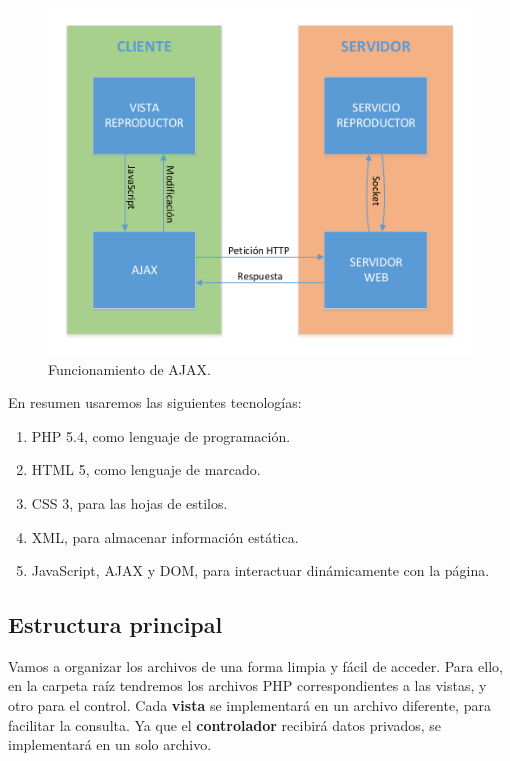 \begin{figure}[H]
	\noindent \begin{centering}
		\includegraphics[width=\linewidth/2]{capitulo5/ajax}
		\par\end{centering}
	\smallskip
	\caption{\label{fig:ajax} Funcionamiento de AJAX.}
\end{figure} 

\newpage

En resumen usaremos las siguientes tecnologías:

\begin{enumerate}
	\item \acrshort{PHP} 5.4, como lenguaje de programación.
	\item \acrshort{HTML} 5, como lenguaje de marcado.
	\item \acrshort{CSS} 3, para las hojas de estilos.
	\item \acrshort{XML}, para almacenar información estática.
	\item JavaScript, \acrshort{AJAX} y \acrshort{DOM}, para interactuar dinámicamente con la página.
\end{enumerate}

\subsection{Estructura principal}

Vamos a organizar los archivos de una forma limpia y fácil de acceder. Para ello, en la carpeta raíz tendremos los archivos \acrshort{PHP} correspondientes a las vistas, y otro para el control. Cada \textbf{vista} se implementará en un archivo diferente, para facilitar la consulta. Ya que el \textbf{controlador} recibirá datos privados, se implementará en un solo archivo.

